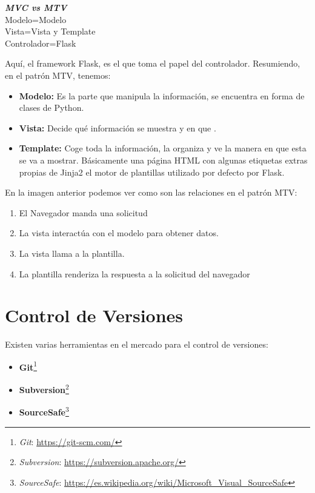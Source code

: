 \begin{flushleft}
\textbf{\emph{MVC vs	MTV\\}}
Modelo=Modelo\\
Vista=Vista y Template\\
Controlador=Flask\\
\end{flushleft}



Aquí, el framework Flask, es el que toma el papel del controlador.
Resumiendo, en el patrón MTV, tenemos:
\begin{itemize}
\item\textbf{Modelo:} Es la parte que manipula la información, se encuentra en forma de clases de Python.
\item\textbf{Vista:} Decide qué información se muestra y en que .
\item\textbf{Template:} Coge toda la información, la organiza y ve la manera en que esta se va a mostrar. Básicamente una página HTML con algunas etiquetas extras propias de Jinja2 el motor de plantillas utilizado por defecto por Flask.
\end{itemize}


En la imagen anterior podemos ver como son las relaciones en el patrón MTV:
\begin{enumerate}
\item El Navegador manda una solicitud 
\item La vista interactúa con el modelo para obtener datos. 
\item La vista llama a la plantilla. 
\item La plantilla renderiza la respuesta a la solicitud del navegador 
\end{enumerate}

\section{Control de Versiones}

Existen varias herramientas en el mercado para el control de versiones:
\begin{itemize}
\item\textbf{Git}\footnote{\textsl{Git}: \url{https://git-scm.com/}}
\item \textbf{Subversion}\footnote{\textsl{Subversion}: \url{https://subversion.apache.org/}}
\item \textbf{SourceSafe}\footnote{\textsl{SourceSafe}: \url{https://es.wikipedia.org/wiki/Microsoft_Visual_SourceSafe}}
\end{itemize}

